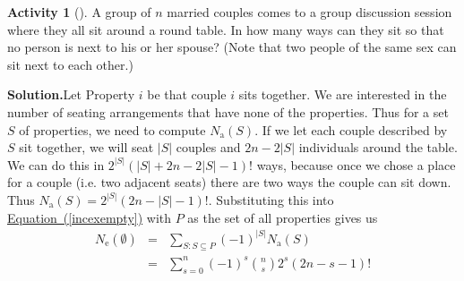 \documentclass[10pt,]{book}
\theoremstyle{plain}
\theoremstyle{definition}
\newtheorem{activity}[project]{Activity}
\numberwithin{equation}{chapter}
\newcommand{\amp}{&}
\begin{document}
\begin{activity}[]\label{relaxedmenage}
A group of \(n\) married couples comes to a group discussion session where they all sit around a round table. In how many ways can they sit so that no person is next to his or her spouse? (Note that two people of the same sex can sit next to each other.)%
\par\medskip\noindent%
\textbf{Solution.}\quad Let Property \(i\) be that couple \(i\) sits together. We are interested in the number of seating arrangements that have none of the properties. Thus for a set \(S\) of properties, we need to compute \(N_{\mbox{a} }(S)\). If we let each couple described by \(S\) sit together, we will seat \(|S|\) couples and \(2n-2|S|\) individuals around the table. We can do this in \(2^{|S|}(|S| + 2n-2 |S|-1)!\) ways, because once we chose a place for a couple (i.e. two adjacent seats) there are two ways the couple can sit down. Thus \(N_{\mbox{a} }(S) =2^{|S|}(2n-|S|-1)!\). Substituting this into \hyperref[incexempty]{Equation~(\ref{incexempty})} with \(P\) as the set of all properties gives us%
\begin{align*}
N_{\mbox{e} }(\emptyset) \amp =\amp  \sum_{S:S\subseteq P}
(-1)^{|S|} N_{\mbox{a} }(S)\\
\amp =\amp \sum_{s=0}^n(-1)^s\binom{n}{s}2^{s}(2n- s-1)!
\end{align*}
%
\end{activity}
\end{document}
